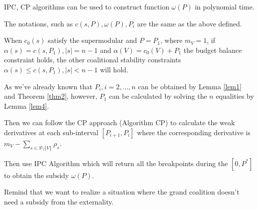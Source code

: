 \begin{corollary} \label{cor-3}
  IPC, CP algorithms can be used to construct function $\omega(P)$ in polynomial time.
\end{corollary}

The notations, such as $c(s,P), \omega(P), P_i$ are the same as the above defined.

\begin{lem}\label{lem4}
When $c_0(s)$ satisfy the supermodular and $P=P_1$, where $m_V=1$, if $\alpha(s)=c(s, P_1), \left| s \right|= n-1$ and $\alpha(V)=c_0(V)+P_1$ the budget balance constraint holds, the other coalitional stability constraints $\alpha(s) \leq c(s, P_1), \left| s \right| < n-1$ will hold.
\end{lem}

As we've already known that $P_i, i = 2,\ldots,n$ can be obtained by Lemma \ref{lem1} and Theorem \ref{thm2}, however, $P_1$ can be calculated by solving the $n$ equalities by Lemma \ref{lem4}.

Then we can follow the CP approach (Algorithm CP) to calculate the weak derivatives at each sub-interval $[P_{i+1},P_{i}]$ where the corresponding derivative is $m_V-\sum_{s\in S\setminus\{V\}} \rho_s$.

Then use IPC Algorithm which will return all the breakpoints during the $[0, P^*]$ to obtain the subsidy $\omega(P)$.

Remind that we want to realize a situation where the grand coalition doesn't need a subsidy from the externality.

